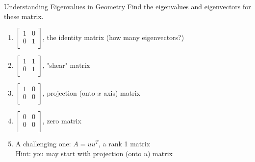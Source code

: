 \documentclass{beamer}
\begin{document}
\begin{frame}{Understanding Eigenvalues in Geometry}
    Find the eigenvalues and eigenvectors for these matrix.

    \begin{enumerate}
        \item $\left[ \begin{matrix}
            1&		0\\
            0&		1\\
        \end{matrix} \right]$, the identity matrix (how many eigenvectors?)
        \item $\left[ \begin{matrix}
            1&		1\\
            0&		1\\
        \end{matrix} \right]$, "shear" matrix
        \item $\left[ \begin{matrix}
            1&		0\\
            0&		0\\
        \end{matrix} \right]$, projection (onto $x$ axis) matrix
        \item $\left[ \begin{matrix}
            0&		0\\
            0&		0\\
        \end{matrix} \right]$, zero matrix
        \item A challenging one: $A=uu^T$, a rank 1 matrix\\
        Hint: you may start with projection (onto $u$) matrix
    \end{enumerate}
    \end{frame}
\end{document}
